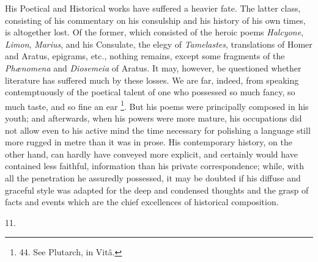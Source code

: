 His Poetical and Historical
works have suffered a heavier fate. The latter class, consisting of
his commentary on his consulship and his history of his own times, is
altogether lost. Of the former, which consisted of the heroic poems \emph{Halcyone},
\emph{Limon}, \emph{Marius}, and his Consulate, the elegy of \emph{Tamelastes},
translations of Homer and Aratus, epigrams, etc., nothing remains,
except some fragments of the \emph{Phænomena} and \emph{Diosemeia} of
Aratus. It may, however, be questioned whether literature has suffered
much by these losses. We are far, indeed, from speaking contemptuously
of the poetical talent of one who possessed so much fancy, so much
taste, and so fine an ear \footnote{44. See Plutarch, in
Vitâ.}. But his poems were principally
composed in his youth; and afterwards, when his powers were more
mature, his occupations did not allow even to his active mind the time
necessary for polishing a language still more rugged in metre than it
was in prose. His contemporary history, on the other hand, can hardly
have conveyed more explicit, and certainly would have contained less
faithful, information than his private correspondence; while, with all
the penetration he assuredly possessed, it may be doubted if his
diffuse and graceful style was adapted for the deep and condensed
thoughts and the grasp of facts and events which are the chief
excellences of historical composition.

11.

